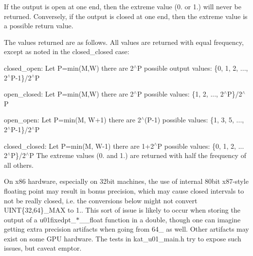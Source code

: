 If the output is open at one end, then the extreme value (0. or 1.) will never be returned. Conversely, if the output is closed at one end, then the extreme value is a possible return value.

The values returned are as follows. All values are returned with equal frequency, except as noted in the closed\+\_\+closed case\+:

closed\+\_\+open\+: Let P=min(\+M,\+W) there are 2$^\wedge$P possible output values\+: \{0, 1, 2, ..., 2$^\wedge$\+P-\/1\}/2$^\wedge$P

open\+\_\+closed\+: Let P=min(\+M,\+W) there are 2$^\wedge$P possible values\+: \{1, 2, ..., 2$^\wedge$P\}/2$^\wedge$P

open\+\_\+open\+: Let P=min(M, W+1) there are 2$^\wedge$(P-\/1) possible values\+: \{1, 3, 5, ..., 2$^\wedge$\+P-\/1\}/2$^\wedge$P

closed\+\_\+closed\+: Let P=min(M, W-\/1) there are 1+2$^\wedge$P possible values\+: \{0, 1, 2, ... 2$^\wedge$P\}/2$^\wedge$P The extreme values (0. and 1.) are returned with half the frequency of all others.

On x86 hardware, especially on 32bit machines, the use of internal 80bit x87-\/style floating point may result in \textquotesingle{}bonus\textquotesingle{} precision, which may cause closed intervals to not be really closed, i.\+e. the conversions below might not convert U\+I\+NT\{32,64\}\+\_\+\+M\+AX to 1.. This sort of issue is likely to occur when storing the output of a u01fixedpt\+\_\+$\ast$\+\_\+\_\+float function in a double, though one can imagine getting extra precision artifacts when going from 64\+\_ as well. Other artifacts may exist on some G\+PU hardware. The tests in kat\+\_\+u01\+\_\+main.\+h try to expose such issues, but caveat emptor. 